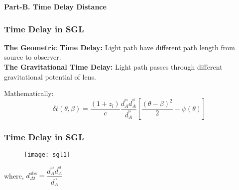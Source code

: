 \documentclass[10pt,xcolor={dvipsnames}]{beamer}
\begin{document}
\begin{frame}
\vspace{5mm}
\begin{center}
\textbf{Part-B. Time Delay Distance}
\end{center}
\end{frame} 
 \begin{frame}
  \frametitle{Time Delay in SGL}
  \vspace{4mm}
  \textbf{The Geometric Time Delay:} Light path have different path length from source to observer.
 \vspace{6mm}\\
   \textbf{The Gravitational Time Delay:} Light path passes through different gravitational potential of lens.
\vspace{6mm}
\begin{center}
\end{center}
Mathematically:
$$
\delta t(\theta, \beta)=\dfrac{\left(1+z_{l}\right)}{c} \dfrac{d_{A}^{^{o s}} d_{A}^{^{o l}}}{d_{A}^{^{l s}}}\left[\dfrac{(\theta-\beta)^{2}}{2}-\psi(\theta)\right]
$$
\end{frame}
\begin{frame}
\frametitle{Time Delay in SGL}
 \begin{figure}[ht!]
\centering
\texttt{[image: sgl1]}
\end{figure} 
\begin{center}
 where, $d_{\Delta t}^{\mathrm{obs}}=\dfrac{d_{A}^{^{o s}} d_{A}^{^{o l}}}{d_{A}^{^{l s}}}$
\end{center}
\end{frame}
\end{document}
